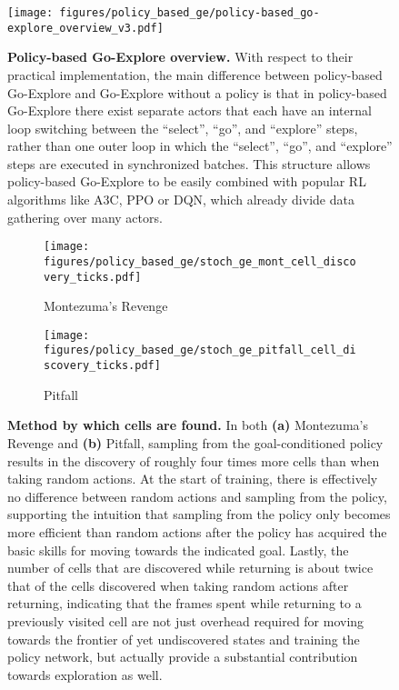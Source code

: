 \documentclass{nature}
\renewcommand*{\cite}[1]{\supercite{#1}}
\begin{document}
\begin{figure}[ht!]
        \centering
        \texttt{[image: figures/policy\_based\_ge/policy-based\_go-explore\_overview\_v3.pdf]}
        \caption{\textbf{Policy-based Go-Explore overview.} With respect to their practical implementation, the main difference between policy-based Go-Explore and Go-Explore without a policy is that in policy-based Go-Explore there exist separate actors that each have an internal loop switching between the ``select'', ``go'', and ``explore'' steps, rather than one outer loop in which the ``select'', ``go'', and ``explore'' steps are executed in synchronized batches. This structure allows policy-based Go-Explore to be easily combined with popular RL algorithms like A3C\cite{mnih2016asynchronous}, PPO\cite{Schulman2017ProximalPO} or DQN\cite{mnih:nature15}, which already divide data gathering over many actors.}
    \label{efig:policy_based_ge_overview}
\end{figure}

\begin{figure}[ht!]
    \centering
    \begin{subfigure}[t]{0.45\textwidth}
        \centering
        \texttt{[image: figures/policy\_based\_ge/stoch\_ge\_mont\_cell\_discovery\_ticks.pdf]}
        \caption{Montezuma's Revenge}
    \end{subfigure}\begin{subfigure}[t]{0.45\textwidth}
        \centering
        \texttt{[image: figures/policy\_based\_ge/stoch\_ge\_pitfall\_cell\_discovery\_ticks.pdf]}
        \caption{Pitfall}
    \end{subfigure}\caption{\textbf{Method by which cells are found.} In both \textbf{(a)} Montezuma's Revenge and \textbf{(b)} Pitfall, sampling from the goal-conditioned policy results in the discovery of roughly four times more cells than when taking random actions. At the start of training, there is effectively no difference between random actions and sampling from the policy, supporting the intuition that sampling from the policy only becomes more efficient than random actions after the policy has acquired the basic skills for moving towards the indicated goal. Lastly, the number of cells that are discovered while returning is about twice that of the cells discovered when taking random actions after returning, indicating that the frames spent while returning to a previously visited cell are not just overhead required for moving towards the frontier of yet undiscovered states and training the policy network, but actually provide a substantial contribution towards exploration as well.}
    \label{efig:policy_based_ge_cell_discovery}
\end{figure}
\end{document}
